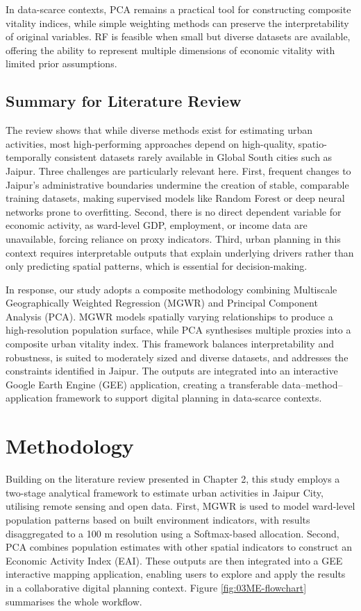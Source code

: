 \documentclass[
  12pt,
  oneside]{book}
\begin{document}
In data-scarce contexts, PCA remains a practical tool for constructing composite vitality indices, while simple weighting methods can preserve the interpretability of original variables. RF is feasible when small but diverse datasets are available, offering the ability to represent multiple dimensions of economic vitality with limited prior assumptions.

\section{Summary for Literature Review}\label{summary-for-literature-review}

The review shows that while diverse methods exist for estimating urban activities, most high-performing approaches depend on high-quality, spatio-temporally consistent datasets rarely available in Global South cities such as Jaipur. Three challenges are particularly relevant here. First, frequent changes to Jaipur's administrative boundaries undermine the creation of stable, comparable training datasets, making supervised models like Random Forest or deep neural networks prone to overfitting. Second, there is no direct dependent variable for economic activity, as ward-level GDP, employment, or income data are unavailable, forcing reliance on proxy indicators. Third, urban planning in this context requires interpretable outputs that explain underlying drivers rather than only predicting spatial patterns, which is essential for decision-making.

In response, our study adopts a composite methodology combining Multiscale Geographically Weighted Regression (MGWR) and Principal Component Analysis (PCA). MGWR models spatially varying relationships to produce a high-resolution population surface, while PCA synthesises multiple proxies into a composite urban vitality index. This framework balances interpretability and robustness, is suited to moderately sized and diverse datasets, and addresses the constraints identified in Jaipur. The outputs are integrated into an interactive Google Earth Engine (GEE) application, creating a transferable data--method--application framework to support digital planning in data-scarce contexts.

\chapter{Methodology}\label{methodology}

Building on the literature review presented in Chapter 2, this study employs a two-stage analytical framework to estimate urban activities in Jaipur City, utilising remote sensing and open data. First, MGWR is used to model ward-level population patterns based on built environment indicators, with results disaggregated to a 100 m resolution using a Softmax-based allocation. Second, PCA combines population estimates with other spatial indicators to construct an Economic Activity Index (EAI). These outputs are then integrated into a GEE interactive mapping application, enabling users to explore and apply the results in a collaborative digital planning context. Figure \ref{fig:03ME-flowchart} summarises the whole workflow.
\end{document}
